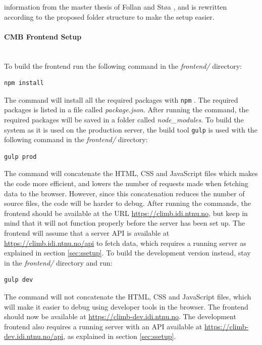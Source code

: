  information from the master thesis of Follan and Støa \cite{mt:T&S}, and is rewritten according to the proposed folder structure to make the setup easier.

\paragraph*{CMB Frontend Setup} \hfill \\
To build the frontend run the following command in the \textit{frontend/} directory:
\begin{lstlisting}[language=sh]
npm install
\end{lstlisting}
The command will install all the required packages with \texttt{npm} \cite{NPM}. The required packages is listed in a file called \textit{package.json}. After running the command, the required packages will be saved in a folder called \textit{node\_modules}. To build the system as it is used on the production server, the build tool \texttt{gulp} \cite{GULP} is used with the following command in the \textit{frontend/} directory:
\begin{lstlisting}[language=sh]
gulp prod
\end{lstlisting}
The command will concatenate the HTML, CSS and JavaScript files which makes the code more efficient, and lowers the number of requests made when fetching data to the browser. However, since this concatenation reduces the number of source files, the code will be harder to debug. After running the commands, the frontend should be available at the URL \url{https://climb.idi.ntnu.no}, but keep in mind that it will not function properly before the server has been set up. The frontend will assume that a server API is available at \url{https://climb.idi.ntnu.no/api} to fetch data, which requires a running server as explained in section \ref{sec:ssetup}. To build the development version instead, stay in the \textit{frontend/} directory and run:
\begin{lstlisting}[language=sh]
gulp dev
\end{lstlisting}
The command will not concatenate the HTML, CSS and JavaScript files, which will make it easier to debug using developer tools in the browser. The frontend should now be available at \url{https://climb-dev.idi.ntnu.no}. The development frontend also requires a running server with an API available at \url{https://climb-dev.idi.ntnu.no/api}, as explained in section \ref{sec:ssetup}.

